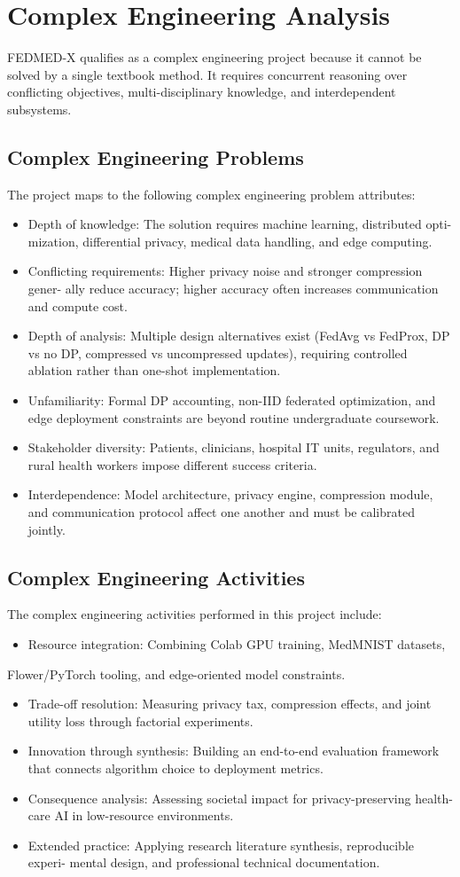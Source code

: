 \documentclass[12pt,a4paper]{report}
\begin{document}
\section{Complex Engineering Analysis}
FEDMED-X qualifies as a complex engineering project because it cannot be solved by a single textbook method. It requires concurrent reasoning over conflicting objectives, multi-disciplinary knowledge, and interdependent subsystems.
\subsection{Complex Engineering Problems}
The project maps to the following complex engineering problem attributes:
\begin{itemize}
\item Depth of knowledge: The solution requires machine learning, distributed opti- mization, differential privacy, medical data handling, and edge computing.
\item Conflicting requirements: Higher privacy noise and stronger compression gener- ally reduce accuracy; higher accuracy often increases communication and compute cost.
\item Depth of analysis: Multiple design alternatives exist (FedAvg vs FedProx, DP vs no DP, compressed vs uncompressed updates), requiring controlled ablation rather than one-shot implementation.
\item Unfamiliarity: Formal DP accounting, non-IID federated optimization, and edge deployment constraints are beyond routine undergraduate coursework.
\item Stakeholder diversity: Patients, clinicians, hospital IT units, regulators, and rural health workers impose different success criteria.
\item Interdependence: Model architecture, privacy engine, compression module, and communication protocol affect one another and must be calibrated jointly.
\end{itemize}
\subsection{Complex Engineering Activities}
The complex engineering activities performed in this project include:
\begin{itemize}
\item Resource integration: Combining Colab GPU training, MedMNIST datasets,
\end{itemize}
Flower/PyTorch tooling, and edge-oriented model constraints.
\begin{itemize}
\item Trade-off resolution: Measuring privacy tax, compression effects, and joint utility loss through factorial experiments.
\item Innovation through synthesis: Building an end-to-end evaluation framework that connects algorithm choice to deployment metrics.
\item Consequence analysis: Assessing societal impact for privacy-preserving health- care AI in low-resource environments.
\item Extended practice: Applying research literature synthesis, reproducible experi- mental design, and professional technical documentation.
\end{itemize}
\end{document}
